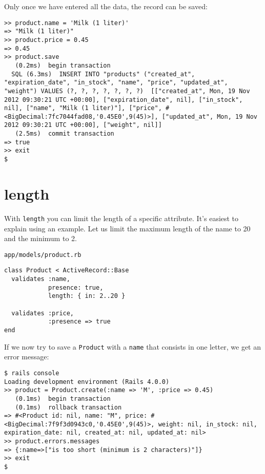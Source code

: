 \documentclass[a4paper]{book}
\begin{document}
Only once we have entered all the data, the record can be saved:

\begin{shaded}\begin{verbatim}
>> product.name = 'Milk (1 liter)'
=> "Milk (1 liter)"
>> product.price = 0.45
=> 0.45
>> product.save
   (0.2ms)  begin transaction
  SQL (6.3ms)  INSERT INTO "products" ("created_at", "expiration_date", "in_stock", "name", "price", "updated_at", "weight") VALUES (?, ?, ?, ?, ?, ?, ?)  [["created_at", Mon, 19 Nov 2012 09:30:21 UTC +00:00], ["expiration_date", nil], ["in_stock", nil], ["name", "Milk (1 liter)"], ["price", #<BigDecimal:7fc7044fad08,'0.45E0',9(45)>], ["updated_at", Mon, 19 Nov 2012 09:30:21 UTC +00:00], ["weight", nil]]
   (2.5ms)  commit transaction
=> true
>> exit
$
\end{verbatim}\end{shaded}

\section{length}\label{length}

With \texttt{length} you can limit the length of a specific attribute. It's easiest to explain using an example. Let us limit the maximum length of the name to 20 and the minimum to 2.

\texttt{app/models/product.rb}

\begin{shaded}\begin{verbatim}
class Product < ActiveRecord::Base
  validates :name,
            presence: true,
            length: { in: 2..20 }

  validates :price,
            :presence => true
end
\end{verbatim}\end{shaded}

If we now try to save a \texttt{Product} with a \texttt{name} that consists in one letter, we get an error message:

\begin{shaded}\begin{verbatim}
$ rails console
Loading development environment (Rails 4.0.0)
>> product = Product.create(:name => 'M', :price => 0.45)
   (0.1ms)  begin transaction
   (0.1ms)  rollback transaction
=> #<Product id: nil, name: "M", price: #<BigDecimal:7f9f3d0943c0,'0.45E0',9(45)>, weight: nil, in_stock: nil, expiration_date: nil, created_at: nil, updated_at: nil>
>> product.errors.messages
=> {:name=>["is too short (minimum is 2 characters)"]}
>> exit
$
\end{verbatim}\end{shaded}
\end{document}
